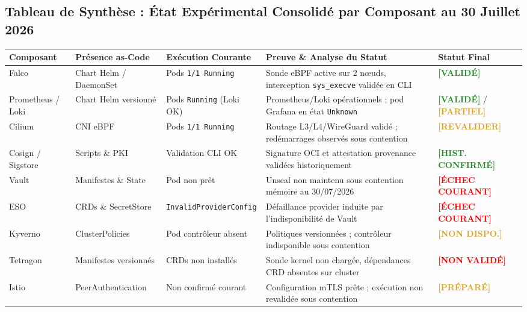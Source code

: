 \subsection{Tableau de Synthèse : État Expérimental Consolidé par Composant au 30 Juillet 2026}

\begin{table}[H]
\centering
\scriptsize
\begin{tabular}{@{}p{2.8cm}p{2.2cm}p{2.2cm}p{4.8cm}p{1.8cm}@{}}
\toprule
\textbf{Composant} & \textbf{Présence as-Code} & \textbf{Exécution Courante} & \textbf{Preuve \& Analyse du Statut} & \textbf{Statut Final} \\
\midrule
Falco & Chart Helm / DaemonSet & Pods \texttt{1/1 Running} & Sonde eBPF active sur 2 nœuds, interception \texttt{sys\_execve} validée en CLI & \textcolor{ForestGreen}{\textbf{[VALIDÉ]}} \\
Prometheus / Loki & Chart Helm versionné & Pods \texttt{Running} (Loki OK) & Prometheus/Loki opérationnels ; pod Grafana en état \texttt{Unknown} & \textcolor{ForestGreen}{\textbf{[VALIDÉ]}} / \textcolor{Goldenrod}{\textbf{[PARTIEL]}} \\
Cilium & CNI eBPF & Pods \texttt{1/1 Running} & Routage L3/L4/WireGuard validé ; redémarrages observés sous contention & \textcolor{Goldenrod}{\textbf{[REVALIDER]}} \\
Cosign / Sigstore & Scripts \& PKI & Validation CLI OK & Signature OCI et attestation provenance validées historiquement & \textcolor{ForestGreen}{\textbf{[HIST. CONFIRMÉ]}} \\
Vault & Manifestes \& State & Pod non prêt & Unseal non maintenu sous contention mémoire au 30/07/2026 & \textcolor{red}{\textbf{[ÉCHEC COURANT]}} \\
ESO & CRDs \& SecretStore & \texttt{InvalidProviderConfig} & Défaillance provider induite par l'indisponibilité de Vault & \textcolor{red}{\textbf{[ÉCHEC COURANT]}} \\
Kyverno & ClusterPolicies & Pod contrôleur absent & Politiques versionnées ; contrôleur indisponible sous contention & \textcolor{Goldenrod}{\textbf{[NON DISPO.]}} \\
Tetragon & Manifestes versionnés & CRDs non installés & Sonde kernel non chargée, dépendances CRD absentes sur cluster & \textcolor{red}{\textbf{[NON VALIDÉ]}} \\
Istio & PeerAuthentication & Non confirmé courant & Configuration mTLS prête ; exécution non revalidée sous contention & \textcolor{Goldenrod}{\textbf{[PRÉPARÉ]}} \\

\end{tabular}
\end{table}
